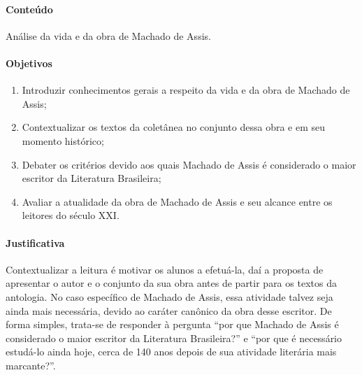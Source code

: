 \documentclass[11pt]{extarticle}
\begin{document}
\paragraph{Conteúdo} Análise da vida e da obra de Machado de Assis.

\paragraph{Objetivos}
\begin{enumerate}
\item
Introduzir conhecimentos gerais a respeito da
vida e da obra de Machado de Assis; 

\item
Contextualizar os textos da
coletânea no conjunto dessa obra e em seu momento histórico; 

\item
Debater os critérios devido aos quais Machado de Assis é considerado o maior
escritor da Literatura Brasileira; 

\item
Avaliar a atualidade da obra de
Machado de Assis e seu alcance entre os leitores do século XXI.
\end{enumerate}

\paragraph{Justificativa} Contextualizar a leitura é motivar os alunos a
efetuá-la, daí a proposta de apresentar o autor e o conjunto da sua obra
antes de partir para os textos da antologia. No caso específico de
Machado de Assis, essa atividade talvez seja ainda mais necessária,
devido ao caráter canônico da obra desse escritor. De forma simples,
trata-se de responder à pergunta ``por que Machado de Assis é
considerado o maior escritor da Literatura Brasileira?'' e ``por que é
necessário estudá-lo ainda hoje, cerca de 140 anos depois de sua
atividade literária mais marcante?''.
\end{document}
